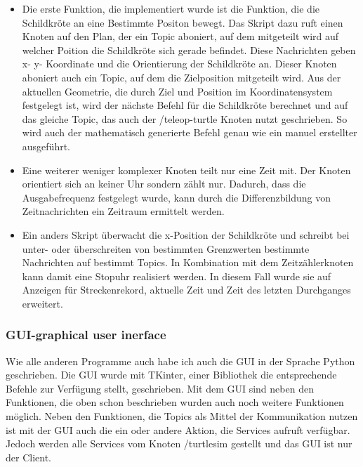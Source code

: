 \documentclass[11pt]{scrartcl}
\begin{document}
\begin{onehalfspace}
\begin{itemize}
\item Die erste Funktion, die implementiert wurde ist die Funktion, die die Schildkröte an eine Bestimmte Positon bewegt. Das Skript dazu ruft einen Knoten auf den Plan, der ein Topic aboniert, auf dem mitgeteilt wird auf welcher Poition die Schildkröte sich gerade befindet. Diese Nachrichten geben x- y- Koordinate und die Orientierung der Schildkröte an. Dieser Knoten aboniert auch ein Topic, auf dem die Zielposition mitgeteilt wird. Aus der aktuellen Geometrie, die durch Ziel und Position im Koordinatensystem festgelegt ist, wird der nächste Befehl für die Schildkröte berechnet und auf das gleiche Topic, das auch der /teleop-turtle Knoten nutzt geschrieben. So wird auch der mathematisch generierte Befehl genau wie ein manuel erstellter ausgeführt.  
\item Eine weiterer weniger komplexer Knoten teilt nur eine Zeit mit. Der Knoten orientiert sich an keiner Uhr sondern zählt nur. Dadurch, dass die Ausgabefrequenz festgelegt wurde, kann durch die Differenzbildung von Zeitnachrichten ein Zeitraum ermittelt werden. 
\item Ein anders Skript überwacht die x-Position der Schildkröte und schreibt bei unter- oder überschreiten von bestimmten Grenzwerten bestimmte Nachrichten auf bestimmt Topics. In Kombination mit dem Zeitzählerknoten kann damit eine Stopuhr realisiert werden. In diesem Fall wurde sie auf Anzeigen für Streckenrekord, aktuelle Zeit und Zeit des letzten Durchganges erweitert.
\end{itemize}


\subsubsection{GUI-graphical user inerface}

Wie alle anderen Programme auch habe ich auch die GUI in der Sprache Python geschrieben. Die GUI wurde mit TKinter, einer Bibliothek die entsprechende Befehle zur Verfügung stellt, geschrieben. Mit dem GUI sind neben den Funktionen, die oben schon beschrieben wurden auch noch weitere Funktionen möglich. Neben den Funktionen, die Topics als Mittel der Kommunikation nutzen ist mit der GUI auch die ein oder andere Aktion, die Services aufruft verfügbar. Jedoch werden alle Services vom Knoten /turtlesim gestellt und das GUI ist nur der Client.
\newpage
\newpage


\end{onehalfspace}
\end{document}
